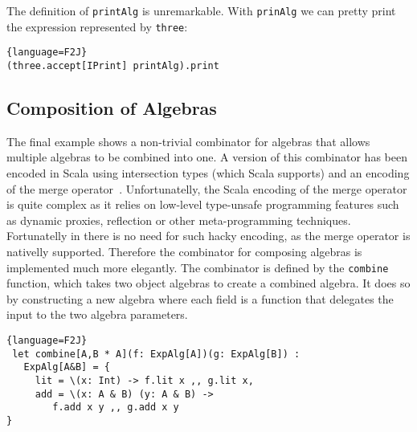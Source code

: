 \noindent The definition of \lstinline{printAlg} is unremarkable.  
With \lstinline{prinAlg} we can pretty print the expression represented
by \lstinline{three}:

\begin{lstlisting}{language=F2J}
(three.accept[IPrint] printAlg).print
\end{lstlisting}

\begin{comment}
The result is \lstinline$"7 - 2"$. Note that the programmer is able to pass \lstinline{lit 2}, which is of type \lstinline{Exp},
to \lstinline{sub}, which expects a \lstinline{SubExp}. The types are compatible
because because \lstinline$Exp$ is a \emph{subtype} of \lstinline$SubExp$. Code
reuse is achieved since we can use the constructors from \lstinline$Exp$ as the
constructor for \lstinline$SubExp$. In Scala, we would have to define two
literal constructors, one for \lstinline$Exp$ and another for
\lstinline$SubExp$.
\end{comment}

\subsection{Composition of Algebras}
The final example shows a non-trivial combinator for algebras that
allows multiple algebras to be combined into one. A version of this
combinator has been encoded in Scala using intersection types
(which Scala supports) and an encoding of the merge
operator~\cite{oliveira2013feature,rendel14attributes}.
Unfortunatelly, the Scala encoding of the merge operator is quite complex as
it relies on low-level type-unsafe programming features such as
dynamic proxies, reflection or other meta-programming techniques.
Fortunatelly in \name there is no need for such hacky encoding, as the
merge operator is nativelly supported. Therefore the combinator for 
composing algebras is implemented much more elegantly. 
The combinator is defined by the \lstinline$combine$ function, which takes two object algebras to create
a combined algebra. It does so by constructing a new algebra
where each field is a function that delegates the input to the two
algebra parameters.

\begin{lstlisting}{language=F2J}
 let combine[A,B * A](f: ExpAlg[A])(g: ExpAlg[B]) : 
   ExpAlg[A&B] = {
     lit = \(x: Int) -> f.lit x ,, g.lit x,
     add = \(x: A & B) (y: A & B) ->
        f.add x y ,, g.add x y
}
\end{lstlisting}

